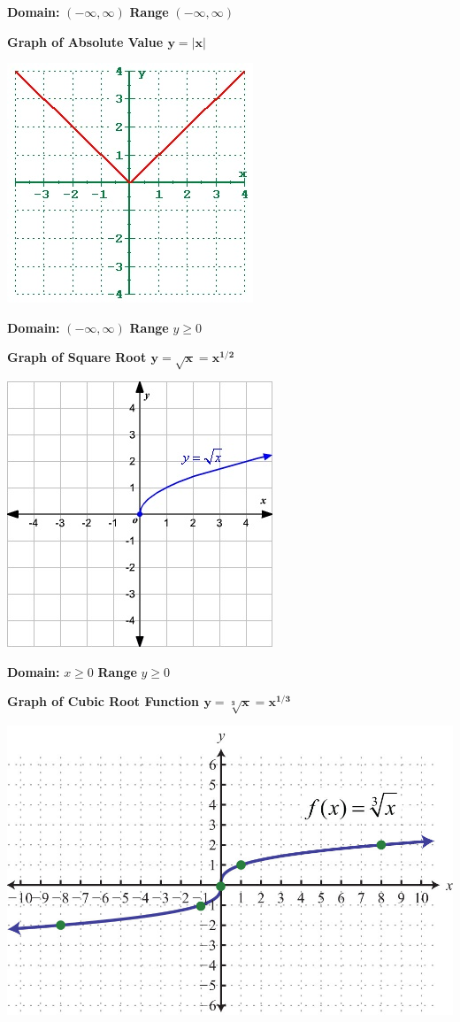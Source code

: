 \documentclass[12pt]{article}
\begin{document}
\textbf{Domain:} $(-\infty, \infty)$ \hspace{2cm} \textbf{Range} $(-\infty, \infty)$

\newpage

\textbf{Graph of Absolute Value $\mathbf{y=|x|}$}

\includegraphics[scale = 0.9]{AbsoluteValue.jpg}

\textbf{Domain:} $(-\infty, \infty)$ \hspace{2cm} \textbf{Range} $y \geq 0$

\textbf{Graph of Square Root $\mathbf{y=\sqrt{x} = x^{1/2}}$}

\includegraphics{SquareRoot.jpg}

\textbf{Domain:} $x \geq 0$ \hspace{2cm} \textbf{Range} $y \geq 0$

\newpage

\textbf{Graph of Cubic Root Function $\mathbf{y=\sqrt[3]{x} = x^{1/3}}$}

\includegraphics[scale = 0.3]{CubeRootFunction.jpg}
\end{document}
